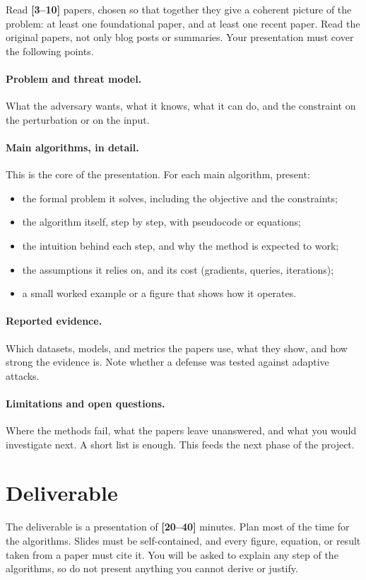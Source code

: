 \documentclass[11pt,a4paper]{extarticle}
\newcommand{\tbd}[1]{\textcolor{accent}{\textbf{[#1]}}}
\begin{document}
Read \tbd{3--10} papers, chosen so that together they give a coherent picture of the problem: at least one foundational paper, and at least one recent paper. Read the original papers, not only blog posts or summaries. Your presentation must cover the following points.

\paragraph{Problem and threat model.} What the adversary wants, what it knows, what it can do, and the constraint on the perturbation or on the input.

\paragraph{Main algorithms, in detail.} This is the core of the presentation. For each main algorithm, present:

\begin{itemize}
  \item the formal problem it solves, including the objective and the constraints;
  \item the algorithm itself, step by step, with pseudocode or equations;
  \item the intuition behind each step, and why the method is expected to work;
  \item the assumptions it relies on, and its cost (gradients, queries, iterations);
  \item a small worked example or a figure that shows how it operates.
\end{itemize}

\paragraph{Reported evidence.} Which datasets, models, and metrics the papers use, what they show, and how strong the evidence is. Note whether a defense was tested against adaptive attacks.

\paragraph{Limitations and open questions.} Where the methods fail, what the papers leave unanswered, and what you would investigate next. A short list is enough. This feeds the next phase of the project.

\section{Deliverable}

The deliverable is a presentation of \tbd{20--40} minutes. Plan most of the time for the algorithms. Slides must be self-contained, and every figure, equation, or result taken from a paper must cite it. You will be asked to explain any step of the algorithms, so do not present anything you cannot derive or justify.
\end{document}
